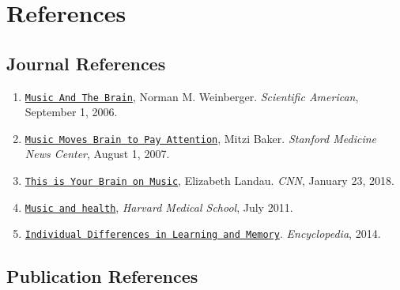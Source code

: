\documentclass[]{article}
\providecommand{\tightlist}{%
  \setlength{\itemsep}{0pt}\setlength{\parskip}{0pt}}
\begin{document}
\newpage 

\section{References}\label{references}

\subsection{Journal References}\label{journal-references}

\begin{enumerate}
\def\labelenumi{(\arabic{enumi})}
\tightlist
\item
  \href{https://www.scientificamerican.com/article/music-and-the-brain-2006-09/}{\texttt{Music\ And\ The\ Brain}},
  Norman M. Weinberger. \emph{Scientific American}, September 1, 2006.
\item
  \href{https://med.stanford.edu/news/all-news/2007/07/music-moves-brain-to-pay-attention-stanford-study-finds.html}{\texttt{Music\ Moves\ Brain\ to\ Pay\ Attention}},
  Mitzi Baker. \emph{Stanford Medicine News Center}, August 1, 2007.
\item
  \href{https://www.cnn.com/2013/04/15/health/brain-music-research/index.html}{\texttt{This\ is\ Your\ Brain\ on\ Music}},
  Elizabeth Landau. \emph{CNN}, January 23, 2018.
\item
  \href{https://www.health.harvard.edu/staying-healthy/music-and-health}{\texttt{Music\ and\ health}},
  \emph{Harvard Medical School}, July 2011.
\item
  \href{https://www.encyclopedia.com/psychology/encyclopedias-almanacs-transcripts-and-maps/individual-differences-learning-and-memory}{\texttt{Individual\ Differences\ in\ Learning\ and\ Memory}}.
  \emph{Encyclopedia}, 2014.
\end{enumerate}

\subsection{Publication References}\label{publication-references}
\end{document}
